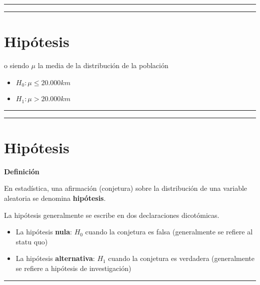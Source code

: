 \documentclass[
]{book}
\providecommand{\tightlist}{%
  \setlength{\itemsep}{0pt}\setlength{\parskip}{0pt}}
\begin{document}
\begin{center}\rule{0.5\linewidth}{0.5pt}\end{center}

\begin{center}\rule{0.5\linewidth}{0.5pt}\end{center}

\hypertarget{hipuxf3tesis-3}{%
\section{Hipótesis}\label{hipuxf3tesis-3}}

o siendo \(\mu\) la media de la distribución de la población

\begin{itemize}
\tightlist
\item
  \(H_0: \mu \leq 20.000km\)
\item
  \(H_1: \mu > 20.000km\)
\end{itemize}

\begin{center}\rule{0.5\linewidth}{0.5pt}\end{center}

\begin{center}\rule{0.5\linewidth}{0.5pt}\end{center}

\hypertarget{hipuxf3tesis-4}{%
\section{Hipótesis}\label{hipuxf3tesis-4}}

\textbf{Definición}

En estadística, una afirmación (conjetura) sobre la distribución de una variable aleatoria se denomina \textbf{hipótesis}.

La hipótesis generalmente se escribe en dos declaraciones dicotómicas.

\begin{itemize}
\tightlist
\item
  La hipótesis \textbf{nula}: \(H_0\) cuando la conjetura es falsa (generalmente se refiere al statu quo)
\item
  La hipótesis \textbf{alternativa}: \(H_1\) cuando la conjetura es verdadera (generalmente se refiere a hipótesis de investigación)
\end{itemize}

\begin{center}\rule{0.5\linewidth}{0.5pt}\end{center}
\end{document}
